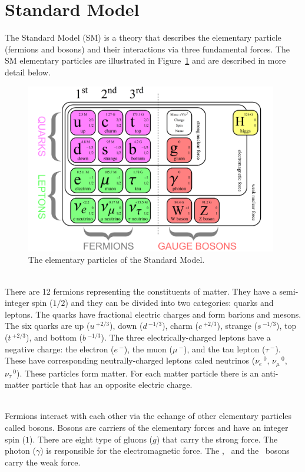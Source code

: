 \section{Standard Model}
\label{sec:StandardModel}

The Standard Model (SM) is a theory that describes the elementary particle (fermions and bosons) and their interactions via three fundamental forces. The SM elementary particles are illustrated in Figure~\ref{fig:SMParticles} and are described in more detail below.

\begin{figure}[!htb]
  \centering
  \includegraphics[width=0.98\textwidth]{./plots/SM.png}
  \caption{The elementary particles of the Standard Model.}
  \label{fig:SMParticles}
\end{figure}

\ \\There are 12 fermions representing the constituents of matter. They have a semi-integer spin ($1/2$) and they can be divided into two categories: quarks and leptons. The quarks have fractional electric charges and form barions and mesons. The six quarks are up ($u\,^{+2/3}$), down ($d\,^{-1/3}$), charm ($c\,^{+2/3}$), strange ($s\,^{-1/3}$), top ($t\,^{+2/3}$), and bottom ($b\,^{-1/3}$). The three electrically-charged leptons have a negative charge: the electron ($e\,^{-}$), the muon ($\mu\,^{-}$), and the tau lepton ($\tau\,^{-}$). These have corresponding neutrally-charged leptons caled neutrinos ($\nu_e\,^0$, $\nu_\mu\,^0$, $\nu_\tau\,^0$). These particles form matter. For each matter particle there is an anti-matter particle that has an opposite electric charge. 

\ \\Fermions interact with each other via the echange of other elementary particles called bosons. Bosons are carriers of the elementary forces and have an integer spin ($1$). There are eight type of gluons ($g$) that carry the strong force. The photon ($\gamma$) is responsible for the electromagnetic force. The \Wplus, \Wminus~and the \Zzero~bosons carry the weak force. 

